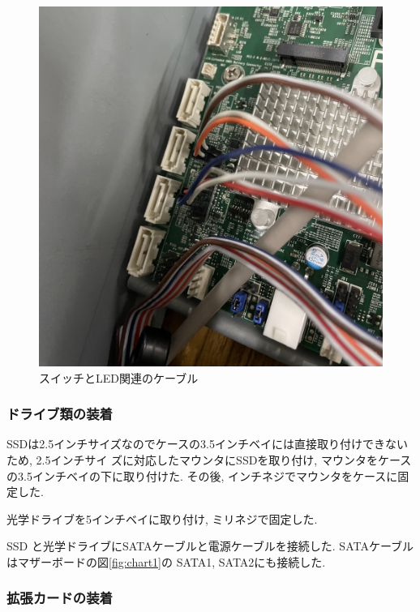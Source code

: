 \documentclass{ltjsarticle} %
\begin{document}
\begin{figure}[H]
  \hfill %
  \begin{minipage}{0.45\textwidth} %
    \centering
    \includegraphics[width=\textwidth]{casecable.jpg} %
    \caption{スイッチとLED関連のケーブル} %
    \label{fig:casecable} %
  \end{minipage}
\end{figure}


\subsubsection{ドライブ類の装着}

SSDは2.5インチサイズなのでケースの3.5インチベイには直接取り付けできないため, 2.5インチサイ
ズに対応したマウンタにSSDを取り付け, マウンタをケースの3.5インチベイの下に取り付けた.
その後, インチネジでマウンタをケースに固定した.

光学ドライブを5インチベイに取り付け, ミリネジで固定した.

SSD と光学ドライブにSATAケーブルと電源ケーブルを接続した. SATAケーブルはマザーボードの図\ref{fig:chart1}の
SATA1, SATA2にも接続した.

\subsubsection{拡張カードの装着}
\end{document}
